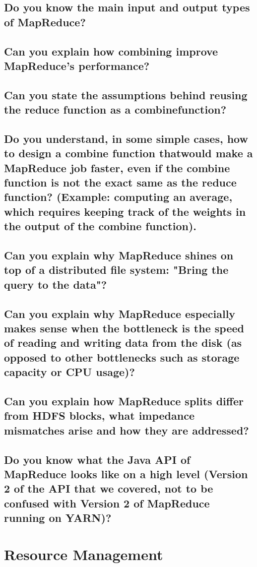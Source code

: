 \documentclass{article}
\begin{document}
\subsection{Do you know the main input and output types of MapReduce?}
\subsection{Can you explain how combining improve MapReduce's performance?}
\subsection{Can you state the assumptions behind reusing the reduce function as a combinefunction?}
\subsection{Do you understand, in some simple cases, how to design a combine function thatwould make a MapReduce job faster, even if the combine function is not the exact same as the reduce function? (Example: computing an average, which requires keeping track of the weights in the output of the combine function).}
\subsection{Can you explain why MapReduce shines on top of a distributed file system: "Bring the query to the data"?}
\subsection{Can you explain why MapReduce especially makes sense when the bottleneck is the speed of reading and writing data from the disk (as opposed to other bottlenecks such as storage capacity or CPU usage)?}
\subsection{Can you explain how MapReduce splits differ from HDFS blocks, what impedance mismatches arise and how they are addressed?}
\subsection{Do you know what the Java API of MapReduce looks like on a high level (Version 2 of the API that we covered, not to be confused with Version 2 of MapReduce running on YARN)?}

\pagebreak

\section{Resource Management}
\end{document}

